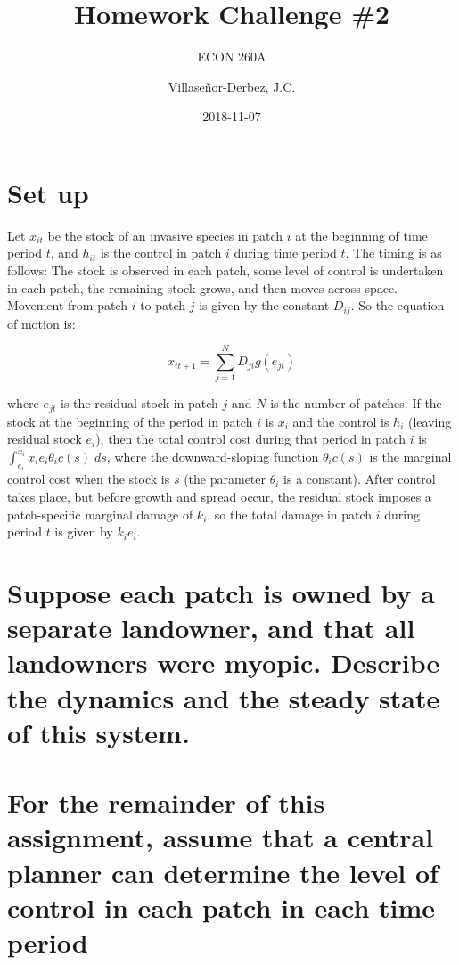 \documentclass[]{article}
\title{Homework Challenge \#2}
\subtitle{ECON 260A}
\author{Villaseñor-Derbez, J.C.}
\date{2018-11-07}
\begin{document}
\maketitle

\section{Set up}\label{set-up}

Let \(x_{it}\) be the stock of an invasive species in patch \(i\) at the
beginning of time period \(t\), and \(h_{it}\) is the control in patch
\(i\) during time period \(t\). The timing is as follows: The stock is
observed in each patch, some level of control is undertaken in each
patch, the remaining stock grows, and then moves across space. Movement
from patch \(i\) to patch \(j\) is given by the constant \(D_{ij}\). So
the equation of motion is:

\[
x_{it+1} = \sum_{j = 1}^N{D_{ji}g(e_{jt})}
\]

where \(e_{jt}\) is the residual stock in patch \(j\) and \(N\) is the
number of patches. If the stock at the beginning of the period in patch
\(i\) is \(x_i\) and the control is \(h_i\) (leaving residual stock
\(e_i\)), then the total control cost during that period in patch \(i\)
is \(\int_{e_i}^{x_i}{x_i e_i \theta_ic(s)\;ds}\), where the
downward-sloping function \(\theta_ic(s)\) is the marginal control cost
when the stock is \(s\) (the parameter \(\theta_i\) is a constant).
After control takes place, but before growth and spread occur, the
residual stock imposes a patch-specific marginal damage of \(k_i\), so
the total damage in patch \(i\) during period \(t\) is given by
\(k_ie_i\).

\section{Suppose each patch is owned by a separate landowner, and that
all landowners were myopic. Describe the dynamics and the steady state
of this
system.}\label{suppose-each-patch-is-owned-by-a-separate-landowner-and-that-all-landowners-were-myopic.-describe-the-dynamics-and-the-steady-state-of-this-system.}

\section{For the remainder of this assignment, assume that a central
planner can determine the level of control in each patch in each time
period}\label{for-the-remainder-of-this-assignment-assume-that-a-central-planner-can-determine-the-level-of-control-in-each-patch-in-each-time-period}
\end{document}
